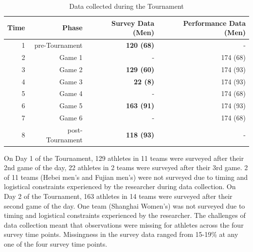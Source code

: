 \documentclass[12pt]{report}
\begin{document}
      \begin{table}[htbp]\caption{Data collected during the Tournament}
        \begin{center}
          \begin{small}
            \begin{tabular}{r r r r}
                Time & Phase & Survey Data (Men) & Performance Data (Men) \\
                \hline\hline
                1 & pre-Tournament & \bf 120 (68) & - \\
                2 & Game 1 & - & 174 (68) \\
                3 & Game 2 & \bf129 (60) & 174 (93) \\
                4 & Game 3 & \bf22 (8) & 174 (93) \\
                \hline
                5 & Game 4 & - & 174 (68) \\
                6 & Game 5 & \bf 163 (91) & 174 (93) \\
                7 & Game 6 & - & 174 (68) \\
                8 & post-Tournament & \bf118 (93) & - \\
            \end{tabular}
          \end{small}
        \end{center}
        \label{tab:tournamentData}
      \end{table}

On Day 1 of the Tournament, 129 athletes in 11 teams were surveyed after their 2nd game of the day, 22 athletes in 2 teams were surveyed after their 3rd game. 2 of 11 teams (Hebei men’s and Fujian men’s) were not surveyed due to timing and logistical constraints experienced by the researcher during data collection. On Day 2 of the Tournament, 163 athletes in 14 teams were surveyed after their second game of the day. One team (Shanghai Women’s) was not surveyed due to timing and logistical constraints experienced by the researcher. The challenges of data collection meant that observations were missing for athletes across the four survey time points. Missingness in the survey data ranged from 15-19\% at any one of the four survey time points.\\

\end{document}
